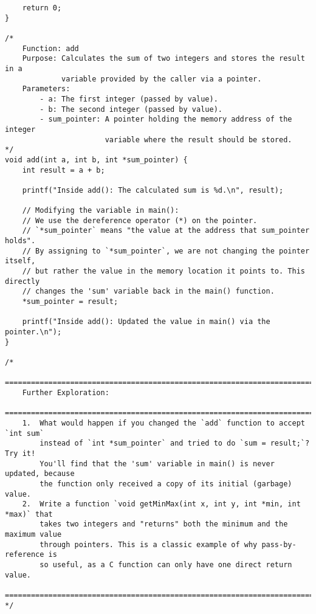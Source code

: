 \documentclass[11pt]{book}
\begin{document}
\begin{verbatim}
    return 0;
}

/*
    Function: add
    Purpose: Calculates the sum of two integers and stores the result in a
             variable provided by the caller via a pointer.
    Parameters:
        - a: The first integer (passed by value).
        - b: The second integer (passed by value).
        - sum_pointer: A pointer holding the memory address of the integer
                       variable where the result should be stored.
*/
void add(int a, int b, int *sum_pointer) {
    int result = a + b;

    printf("Inside add(): The calculated sum is %d.\n", result);

    // Modifying the variable in main():
    // We use the dereference operator (*) on the pointer.
    // `*sum_pointer` means "the value at the address that sum_pointer holds".
    // By assigning to `*sum_pointer`, we are not changing the pointer itself,
    // but rather the value in the memory location it points to. This directly
    // changes the 'sum' variable back in the main() function.
    *sum_pointer = result;

    printf("Inside add(): Updated the value in main() via the pointer.\n");
}

/*
    ================================================================================
    Further Exploration:
    ================================================================================
    1.  What would happen if you changed the `add` function to accept `int sum`
        instead of `int *sum_pointer` and tried to do `sum = result;`? Try it!
        You'll find that the 'sum' variable in main() is never updated, because
        the function only received a copy of its initial (garbage) value.
    2.  Write a function `void getMinMax(int x, int y, int *min, int *max)` that
        takes two integers and "returns" both the minimum and the maximum value
        through pointers. This is a classic example of why pass-by-reference is
        so useful, as a C function can only have one direct return value.
    ================================================================================
*/

\end{verbatim}
\end{document}
